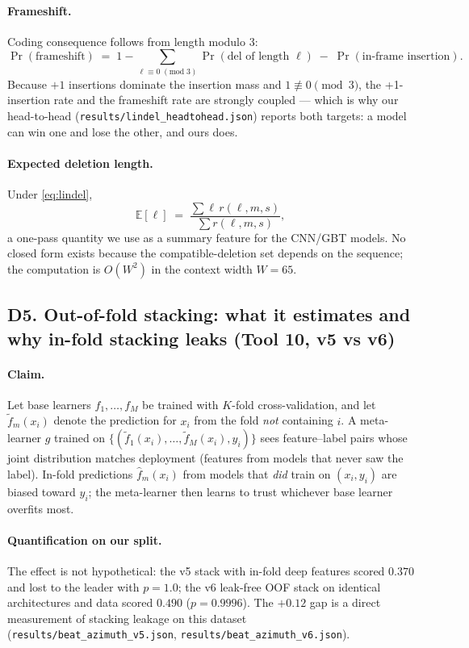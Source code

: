 \paragraph{Frameshift.} Coding consequence follows from length modulo 3:
\begin{equation}
\Pr(\text{frameshift}) \;=\; 1 - \sum_{\ell \equiv 0 \;(\mathrm{mod}\; 3)} \Pr(\text{del of length } \ell)
\;-\; \Pr(\text{in-frame insertion}).
\end{equation}
Because $+1$ insertions dominate the insertion mass and
$1 \not\equiv 0 \pmod 3$, the +1-insertion rate and the frameshift rate
are strongly coupled --- which is why our head-to-head
(\texttt{results/lindel\_headtohead.json}) reports both targets: a model
can win one and lose the other, and ours does.
\paragraph{Expected deletion length.} Under \eqref{eq:lindel},
\begin{equation}
\mathbb{E}[\ell] \;=\; \frac{\sum \ell\, r(\ell,m,s)}{\sum r(\ell,m,s)},
\end{equation}
a one-pass quantity we use as a summary feature for the CNN/GBT models.
No closed form exists because the compatible-deletion set depends on the
sequence; the computation is $O(W^2)$ in the context width $W = 65$.

\subsection{D5. Out-of-fold stacking: what it estimates and why in-fold stacking leaks (Tool 10, v5 vs v6)}
\paragraph{Claim.} Let base learners $f_1, \dots, f_M$ be trained with
$K$-fold cross-validation, and let $\tilde{f}_m(x_i)$ denote the
prediction for $x_i$ from the fold \emph{not} containing $i$. A
meta-learner $g$ trained on $\{(\tilde{f}_1(x_i), \dots, \tilde{f}_M(x_i), y_i)\}$
sees feature--label pairs whose joint distribution matches deployment
(features from models that never saw the label). In-fold predictions
$\hat{f}_m(x_i)$ from models that \emph{did} train on $(x_i, y_i)$ are
biased toward $y_i$; the meta-learner then learns to trust whichever base
learner overfits most.
\paragraph{Quantification on our split.} The effect is not hypothetical:
the v5 stack with in-fold deep features scored $0.370$ and lost to the
leader with $p = 1.0$; the v6 leak-free OOF stack on identical
architectures and data scored $0.490$ ($p = 0.9996$). The $+0.12$ gap is a
direct measurement of stacking leakage on this dataset
(\texttt{results/beat\_azimuth\_v5.json}, \texttt{results/beat\_azimuth\_v6.json}).
